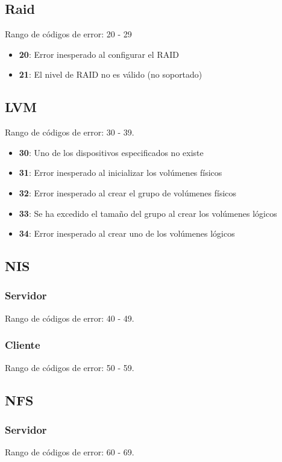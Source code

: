 \documentclass[12pt,a4paper, spanish]{article}
\begin{document}
\subsection{Raid}
Rango de códigos de error: 20 - 29
\begin{itemize}
\item \textbf{20}: Error inesperado al configurar el RAID
\item \textbf{21}: El nivel de RAID no es válido (no soportado)
\end{itemize}

\subsection{LVM}
Rango de códigos de error: 30 - 39.
\begin{itemize}
\item \textbf{30}: Uno de los dispositivos especificados no existe
\item \textbf{31}: Error inesperado al inicializar los volúmenes físicos
\item \textbf{32}: Error inesperado al crear el grupo de volúmenes físicos
\item \textbf{33}: Se ha excedido el tamaño del grupo al crear los volúmenes lógicos
\item \textbf{34}: Error inesperado al crear uno de los volúmenes lógicos
\end{itemize}

\subsection{NIS}

\subsubsection{Servidor}
Rango de códigos de error: 40 - 49.
\subsubsection{Cliente}
Rango de códigos de error: 50 - 59.

\subsection{NFS}

\subsubsection{Servidor}
Rango de códigos de error: 60 - 69.
\end{document}

